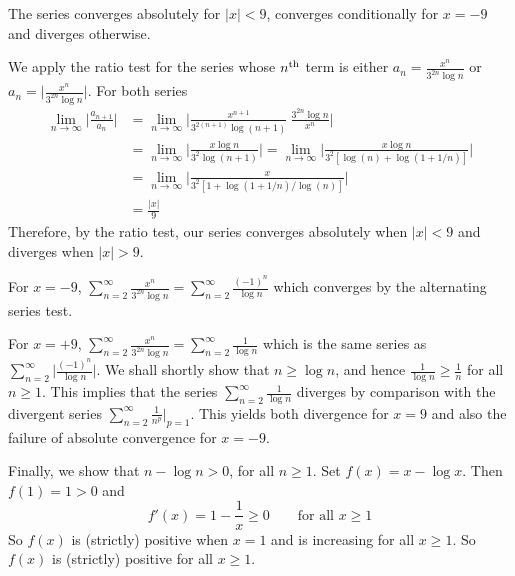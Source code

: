 \begin{answer}
The series converges absolutely for $|x|<9$, converges conditionally
for $x=-9$ and diverges otherwise.
\end{answer}

\begin{solution}
We apply the ratio test for the series whose $n^{\rm th}$
term is either $a_n=\frac{x^n}{3^{2n}\log n}$
or $a_n=\big|\frac{x^n}{3^{2n}\log n}\big|$. For both series
\begin{align*}
\lim_{n\to\infty} \bigg| \frac{ a_{n+1} }{ a_n } \bigg|
&= \lim_{n\to\infty} \bigg| \frac{x^{n+1}}{3^{2(n+1)}\log(n+1)} \
                               \frac{3^{2n}\log n}{x^n} \bigg| \\
&= \lim_{n\to\infty} \bigg| \frac{x\log n}{3^2\log(n+1)} \bigg|
=\lim_{n\to\infty} \bigg| \frac{x\log n}{3^2[\log(n)+\log(1+1/n)]} \bigg| \\
&=\lim_{n\to\infty} \bigg| \frac{x}{3^2[1+\log(1+1/n)/\log(n)]} \bigg| \\
&=\frac{|x|}{9}
\end{align*}
Therefore, by the ratio test, our series converges absolutely when
$|x|<9$ and diverges when $|x|>9$.

For $x=-9$, $\displaystyle\sum_{n=2}^\infty\frac{x^n}{3^{2n}\log n}
=\sum_{n=2}^\infty\frac{(-1)^n}{\log n}$ which converges by
the alternating series test.

For $x=+9$, $\displaystyle\sum_{n=2}^\infty\frac{x^n}{3^{2n}\log n}
=\sum_{n=2}^\infty\frac{1}{\log n}$ which is the same series
as $\displaystyle\sum_{n=2}^\infty\Big|\frac{(-1)^n}{\log n}\Big|$.
We shall shortly
show that $n\ge\log n$, and hence $\frac{1}{\log n}\ge \frac{1}{n}$
for all $n\ge 1$.
This implies that the series $\displaystyle\sum_{n=2}^\infty\frac{1}{\log n}$
diverges by comparison with the divergent series
$\displaystyle\sum_{n=2}^\infty\frac{1}{n^p}\bigg|_{p=1}$.
This yields both divergence for $x=9$ and
also the failure of absolute convergence for $x=-9$.

Finally, we show that $n-\log n > 0$, for all $n\ge 1$.
Set $f(x)=x-\log x$. Then $f(1)=1>0$ and
\begin{equation*}
f'(x) = 1 -\frac{1}{x} \ge 0\qquad\text{for all }x\ge 1
\end{equation*}
So $f(x)$ is (strictly) positive when $x=1$ and is increasing for all
$x\ge 1$. So $f(x)$ is (strictly) positive for all $x\ge 1$.


\end{solution}




